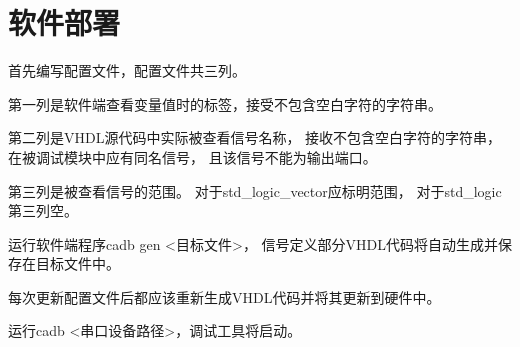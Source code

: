 \section{软件部署}
    首先编写配置文件，配置文件共三列。

    第一列是软件端查看变量值时的标签，接受不包含空白字符的字符串。

    第二列是VHDL源代码中实际被查看信号名称，%
    接收不包含空白字符的字符串，在被调试模块中应有同名信号，%
    且该信号不能为输出端口。

    第三列是被查看信号的范围。%
    对于std\_logic\_vector应标明范围，%
    对于std\_logic第三列空。

    运行软件端程序cadb gen <目标文件>，%
    信号定义部分VHDL代码将自动生成并保存在目标文件中。

    每次更新配置文件后都应该重新生成VHDL代码并将其更新到硬件中。

    运行cadb <串口设备路径>，调试工具将启动。

